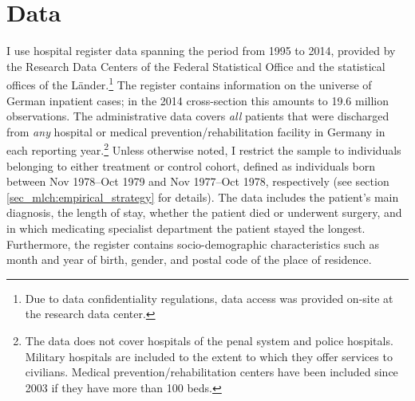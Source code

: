 \bigskip
\section{Data}\label{sec_mlch:data} 
I use hospital register data spanning the period from 1995 to 2014, provided by the Research Data Centers of the Federal Statistical Office and the statistical offices of the Länder.\footnote{Due to data confidentiality regulations, data access was provided on-site at the research data center.} The register contains information on the universe of German inpatient cases; in the 2014 cross-section this amounts to 19.6 million observations. The administrative data covers \textit{all} patients that were discharged from \textit{any} hospital or medical prevention/rehabilitation facility in Germany in each reporting year.\footnote{The data does not cover hospitals of the penal system and police hospitals. Military hospitals are included to the extent to which they offer services to civilians. Medical prevention/rehabilitation centers have been included since 2003 if they have more than 100 beds.} Unless otherwise noted, I restrict the sample to individuals belonging to either treatment or control cohort, defined as individuals born between Nov 1978--Oct 1979 and Nov 1977--Oct 1978, respectively (see section \ref{sec_mlch:empirical_strategy} for details). The data includes the patient's main diagnosis, the length of stay, whether the patient died or underwent surgery, and in which medicating specialist department the patient stayed the longest. Furthermore, the register contains socio-demographic characteristics such as month and year of birth, gender, and postal code of the place of residence.




